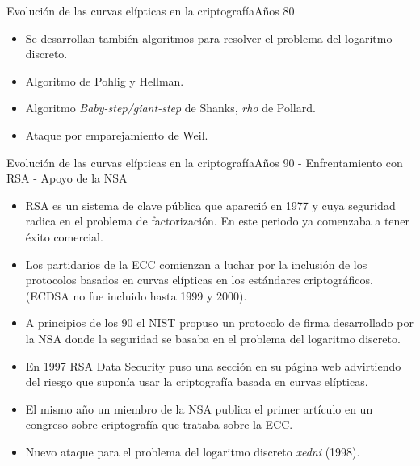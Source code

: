 \documentclass[spanish]{beamer}
\begin{document}
\begin{frame}[fragile]{Evolución de las curvas elípticas en la criptografía}{Años 80}
\begin{itemize}
\item Se desarrollan también algoritmos para resolver el problema del logaritmo discreto. %
\item Algoritmo de Pohlig y Hellman.
\item Algoritmo \textit{Baby-step/giant-step} de Shanks, \textit{rho} de Pollard. %
\item Ataque por emparejamiento de Weil. %
\end{itemize}

\end{frame}

\begin{frame}[fragile]{Evolución de las curvas elípticas en la criptografía}{Años 90 - Enfrentamiento con RSA - Apoyo de la NSA}
\begin{itemize}
\item RSA es un sistema de clave pública que apareció en 1977 y cuya seguridad radica en el problema de factorización. En este periodo ya comenzaba a tener éxito comercial. %
\item Los partidarios de la ECC comienzan a luchar por la inclusión de los protocolos basados en curvas elípticas en los estándares criptográficos. (ECDSA no fue incluido hasta 1999 y 2000).
\item A principios de los 90 el NIST propuso un protocolo de firma desarrollado por la NSA donde la seguridad se basaba en el problema del logaritmo discreto.%
\item En 1997 RSA Data Security puso una sección en su página web advirtiendo del riesgo que suponía usar la criptografía basada en curvas elípticas. %
\item El mismo año  un miembro de la NSA publica
el primer artículo en un congreso sobre criptografía que trataba sobre la ECC.
\item Nuevo ataque para el problema del logaritmo discreto \textit{xedni} (1998). %
\end{itemize}
\end{frame}
\end{document}

